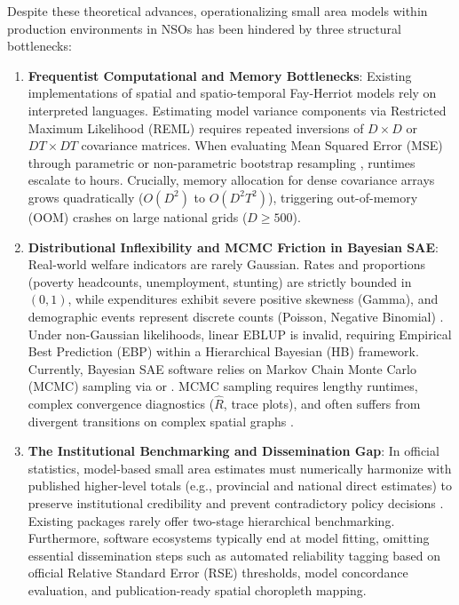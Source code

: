 \documentclass[article]{jss}
\begin{document}
Despite these theoretical advances, operationalizing small area models within production environments in NSOs has been hindered by three structural bottlenecks:
%
\begin{enumerate}
  \item \textbf{Frequentist Computational and Memory Bottlenecks}: Existing implementations of spatial and spatio-temporal Fay-Herriot models rely on interpreted languages. Estimating model variance components via Restricted Maximum Likelihood (REML) requires repeated inversions of $D \times D$ or $DT \times DT$ covariance matrices. When evaluating Mean Squared Error (MSE) through parametric or non-parametric bootstrap resampling \citep{gonzalez2008bootstrap}, runtimes escalate to hours. Crucially, memory allocation for dense covariance arrays grows quadratically ($O(D^2)$ to $O(D^2 T^2)$), triggering out-of-memory (OOM) crashes on large national grids ($D \ge 500$).
  \item \textbf{Distributional Inflexibility and MCMC Friction in Bayesian SAE}: Real-world welfare indicators are rarely Gaussian. Rates and proportions (poverty headcounts, unemployment, stunting) are strictly bounded in $(0, 1)$, while expenditures exhibit severe positive skewness (Gamma), and demographic events represent discrete counts (Poisson, Negative Binomial) \citep{janicki2020properties, fabrizi2011hierarchical, boubeta2016empirical}. Under non-Gaussian likelihoods, linear EBLUP is invalid, requiring Empirical Best Prediction (EBP) within a Hierarchical Bayesian (HB) framework. Currently, Bayesian SAE software relies on Markov Chain Monte Carlo (MCMC) sampling via  or  \citep{denicolo2022tipsae}. MCMC sampling requires lengthy runtimes, complex convergence diagnostics ($\hat{R}$, trace plots), and often suffers from divergent transitions on complex spatial graphs \citep{simpson2017penalising}.
  \item \textbf{The Institutional Benchmarking and Dissemination Gap}: In official statistics, model-based small area estimates must numerically harmonize with published higher-level totals (e.g., provincial and national direct estimates) to preserve institutional credibility and prevent contradictory policy decisions \citep{you2002small, wang2008small, stefan2020benchmarking}. Existing packages rarely offer two-stage hierarchical benchmarking. Furthermore, software ecosystems typically end at model fitting, omitting essential dissemination steps such as automated reliability tagging based on official Relative Standard Error (RSE) thresholds, model concordance evaluation, and publication-ready spatial choropleth mapping.
\end{enumerate}
\end{document}
